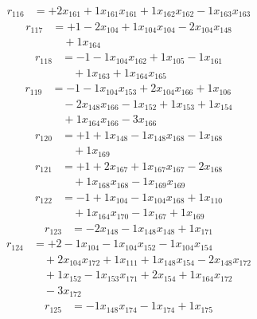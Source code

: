 \[\begin{aligned}
r_{116} &= + 2 x_{161} + 1 x_{161} x_{161} + 1 x_{162} x_{162} - 1 x_{163} x_{163}
\end{aligned}\]
\[\begin{aligned}
r_{117} &= + 1 - 2 x_{104} + 1 x_{104} x_{104} - 2 x_{104} x_{148} \\
 &\quad + 1 x_{164}
\end{aligned}\]
\[\begin{aligned}
r_{118} &= - 1 - 1 x_{104} x_{162} + 1 x_{105} - 1 x_{161} \\
 &\quad + 1 x_{163} + 1 x_{164} x_{165}
\end{aligned}\]
\[\begin{aligned}
r_{119} &= - 1 - 1 x_{104} x_{153} + 2 x_{104} x_{166} + 1 x_{106} \\
 &\quad - 2 x_{148} x_{166} - 1 x_{152} + 1 x_{153} + 1 x_{154} \\
 &\quad + 1 x_{164} x_{166} - 3 x_{166}
\end{aligned}\]
\[\begin{aligned}
r_{120} &= + 1 + 1 x_{148} - 1 x_{148} x_{168} - 1 x_{168} \\
 &\quad + 1 x_{169}
\end{aligned}\]
\[\begin{aligned}
r_{121} &= + 1 + 2 x_{167} + 1 x_{167} x_{167} - 2 x_{168} \\
 &\quad + 1 x_{168} x_{168} - 1 x_{169} x_{169}
\end{aligned}\]
\[\begin{aligned}
r_{122} &= - 1 + 1 x_{104} - 1 x_{104} x_{168} + 1 x_{110} \\
 &\quad + 1 x_{164} x_{170} - 1 x_{167} + 1 x_{169}
\end{aligned}\]
\[\begin{aligned}
r_{123} &= - 2 x_{148} - 1 x_{148} x_{148} + 1 x_{171}
\end{aligned}\]
\[\begin{aligned}
r_{124} &= + 2 - 1 x_{104} - 1 x_{104} x_{152} - 1 x_{104} x_{154} \\
 &\quad + 2 x_{104} x_{172} + 1 x_{111} + 1 x_{148} x_{154} - 2 x_{148} x_{172} \\
 &\quad + 1 x_{152} - 1 x_{153} x_{171} + 2 x_{154} + 1 x_{164} x_{172} \\
 &\quad - 3 x_{172}
\end{aligned}\]
\[\begin{aligned}
r_{125} &= - 1 x_{148} x_{174} - 1 x_{174} + 1 x_{175}
\end{aligned}\]
